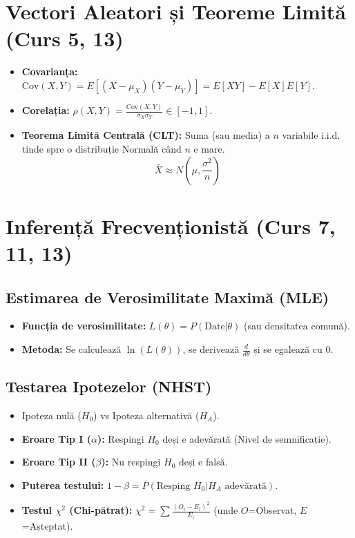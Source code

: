 \documentclass[12pt, a4paper]{article}
\begin{document}
\hrulefill

\section{Vectori Aleatori și Teoreme Limită (Curs 5, 13)}

\begin{itemize}
    \item \textbf{Covarianța:} $\text{Cov}(X,Y) = E[(X-\mu_X)(Y-\mu_Y)] = E[XY] - E[X]E[Y]$.
    \item \textbf{Corelația:} $\rho(X,Y) = \frac{\text{Cov}(X,Y)}{\sigma_X \sigma_Y} \in [-1, 1]$.
    \item \textbf{Teorema Limită Centrală (CLT):} Suma (sau media) a $n$ variabile i.i.d. tinde spre o distribuție Normală când $n$ e mare.
    \[ \bar{X} \approx N\left(\mu, \frac{\sigma^2}{n}\right) \]
\end{itemize}

\hrulefill

\section{Inferență Frecvenționistă (Curs 7, 11, 13)}

\subsection*{Estimarea de Verosimilitate Maximă (MLE)}
\begin{itemize}
    \item \textbf{Funcția de verosimilitate:} $L(\theta) = P(\text{Date} | \theta)$ (sau densitatea comună).
    \item \textbf{Metoda:} Se calculează $\ln(L(\theta))$, se derivează $\frac{d}{d\theta}$ și se egalează cu 0.
\end{itemize}

\subsection*{Testarea Ipotezelor (NHST)}
\begin{itemize}
    \item Ipoteza nulă ($H_0$) vs Ipoteza alternativă ($H_A$).
    \item \textbf{Eroare Tip I ($\alpha$):} Respingi $H_0$ deși e adevărată (Nivel de semnificație).
    \item \textbf{Eroare Tip II ($\beta$):} Nu respingi $H_0$ deși e falsă.
    \item \textbf{Puterea testului:} $1 - \beta = P(\text{Resping } H_0 | H_A \text{ adevărată})$.
    \item \textbf{Testul $\chi^2$ (Chi-pătrat):} $\chi^2 = \sum \frac{(O_i - E_i)^2}{E_i}$ (unde $O$=Observat, $E$=Așteptat).
\end{itemize}
\end{document}
